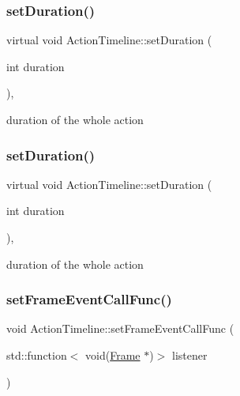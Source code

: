 \subsubsection{\texorpdfstring{set\+Duration()}{setDuration()}\hspace{0.1cm}{\footnotesize\ttfamily [1/2]}}
{\footnotesize\ttfamily virtual void Action\+Timeline\+::set\+Duration (\begin{DoxyParamCaption}\item[{int}]{duration }\end{DoxyParamCaption})\hspace{0.3cm}{\ttfamily [inline]}, {\ttfamily [virtual]}}

duration of the whole action \mbox{\label{classActionTimeline_ab1e49839f767641b62e2a450269fb5b8}} 
\subsubsection{\texorpdfstring{set\+Duration()}{setDuration()}\hspace{0.1cm}{\footnotesize\ttfamily [2/2]}}
{\footnotesize\ttfamily virtual void Action\+Timeline\+::set\+Duration (\begin{DoxyParamCaption}\item[{int}]{duration }\end{DoxyParamCaption})\hspace{0.3cm}{\ttfamily [inline]}, {\ttfamily [virtual]}}

duration of the whole action \mbox{\label{classActionTimeline_ad1ab1387db4e1f8df9af2d0e339046f2}} 
\subsubsection{\texorpdfstring{set\+Frame\+Event\+Call\+Func()}{setFrameEventCallFunc()}\hspace{0.1cm}{\footnotesize\ttfamily [1/2]}}
{\footnotesize\ttfamily void Action\+Timeline\+::set\+Frame\+Event\+Call\+Func (\begin{DoxyParamCaption}\item[{std\+::function$<$ void(\hyperlink{classFrame}{Frame} $\ast$)$>$}]{listener }\end{DoxyParamCaption})}

